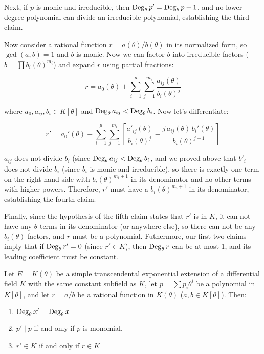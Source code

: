 Next, if $p$ is monic and irreducible, then ${\rm Deg}_\theta\, p' =
{\rm Deg}_\theta\, p - 1$, and no lower degree polynomial can divide
an irreducible polynomial, establishing the third claim.

Now consider a rational function $r=a(\theta)/b(\theta)$ in its
normalized form, so $\gcd(a,b) = 1$ and $b$ is monic.  Now we can
factor $b$ into irreducible factors ($b=\prod b_i(\theta)^{m_i}$)
and expand $r$ using partial fractions:

$$r = a_0(\theta) + \sum_{i=1}^\mu \sum_{j=1}^{m_i} \frac{a_{ij}(\theta)}{b_i(\theta)^j}$$

where $a_0, a_{ij}, b_i \in K[\theta]$ and ${\rm Deg}_\theta\, a_{ij} < {\rm
Deg}_\theta\, b_i$.  Now let's differentiate:

$$r' = a_0'(\theta) + \sum_{i=1}^\mu \sum_{j=1}^{m_i} \left[
\frac{a'_{ij}(\theta)}{b_i(\theta)^j} - \frac{j\, a_{ij}(\theta)\,
b_i'(\theta)}{b_i(\theta)^{j+1}} \right]$$

$a_{ij}$ does not divide $b_i$ (since ${\rm Deg}_\theta\, a_{ij} <
{\rm Deg}_\theta\, b_i$, and we proved above that $b'_i$ does not
divide $b_i$ (since $b_i$ is monic and irreducible), so there is
exactly one term on the right hand side with $b_i(\theta)^{m_i + 1}$
in its denominator and no other terms with higher powers.  Therefore,
$r'$ must have a $b_i(\theta)^{m_i +1}$ in its denominator, establishing
the fourth claim.

Finally, since the hypothesis of the fifth claim states that $r'$ is in
$K$, it can not have any $\theta$ terms in its denominator (or
anywhere else), so there can not be any $b_i(\theta)$ factors, and $r$
must be a polynomial.  Futhermore, our first two claims imply that if
${\rm Deg}_\theta\, r' = 0$ (since $r'\in K$), then ${\rm
Deg}_\theta\, r$ can be at most 1, and its leading coefficient must be
constant.

\endtheorem

\theorem\label{basic exponential properties}
Let $E=K(\theta)$ be a simple transcendental exponential extension of
a differential field $K$ with the same constant subfield as $K$,
let $p=\sum p_i \theta^i$ be a polynomial in $K[\theta]$,
and let $r=a/b$ be a rational function in $K(\theta)$
($a, b \in K[\theta]$).  Then:

\begin{enumerate}
\item ${\rm Deg}_\theta\, x' = {\rm Deg}_\theta\, x$
\item $p' \mid p$ if and only if $p$ is monomial.
\item $r' \in K$ if and only if $r \in K$
\end{enumerate}

